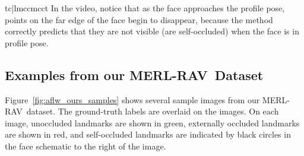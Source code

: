 \documentclass[10pt,twocolumn,letterpaper]{article}
\newcommand{\ourdataset}{MERL-RAV}
\newcommand{\ourdatasetHeading}{MERL-RAV}
\newcommand{\1}{{\bf 1}}
\newcommand{\0}{{\bf 0}}
\begin{document}
\begin{table}[!tb]
\begin{tabular}{tc|lmccmcct}
    In the video, notice that as the face approaches the profile pose, points on the far edge of the face begin to disappear, because the method correctly predicts that they are not visible (are self-occluded) when the face is in profile pose.

    
\subsection{Examples from our \ourdatasetHeading~Dataset}
        Figure~\ref{fig:aflw_ours_samples} shows several sample images from our \ourdataset~dataset. The ground-truth labels are overlaid on the images. On each image, unoccluded landmarks are shown in green, externally occluded landmarks are shown in red, and self-occluded landmarks are indicated by black circles in the face schematic to the right of the image.
        

\end{tabular}
\end{table}
\end{document}
